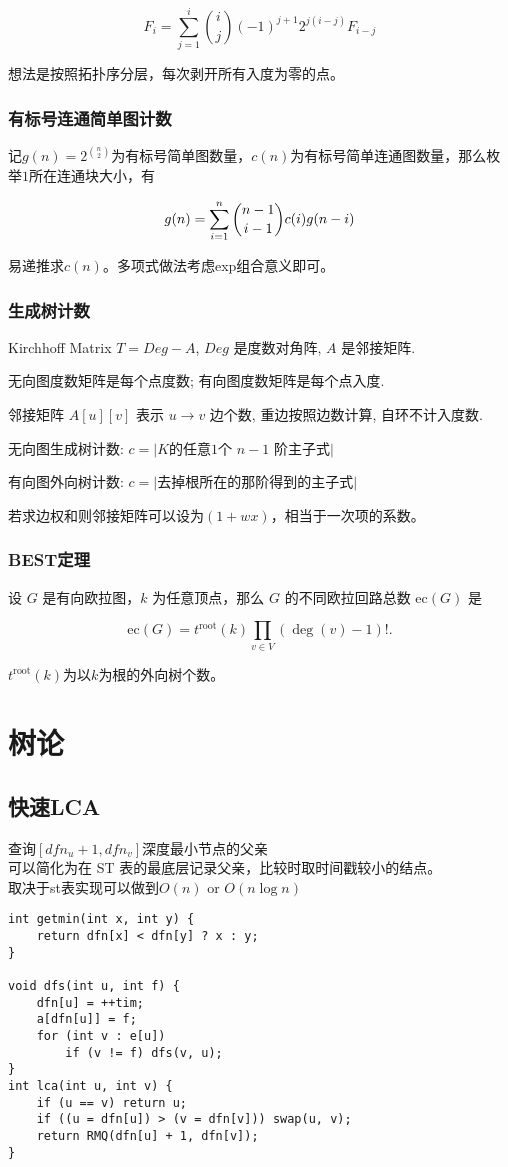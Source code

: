 \documentclass[twoside]{article}
\begin{document}
$$
F_i=\sum_{j=1}^i \binom{i}{j}(-1)^{j+1}2^{j(i-j)}F_{i-j}
$$

想法是按照拓扑序分层，每次剥开所有入度为零的点。

\subsubsection{有标号连通简单图计数}

记$g(n)=2^{\binom n2}$为有标号简单图数量，$c(n)$为有标号简单连通图数量，那么枚举$1$所在连通块大小，有

$$
g(n) = \sum_{i=1}^n \dbinom{n-1}{i-1}c(i)g(n-i)
$$

易递推求$c(n)$。多项式做法考虑exp组合意义即可。

\subsubsection{生成树计数}
Kirchhoff Matrix $T = Deg - A$, $Deg$ 是度数对角阵, $A$ 是邻接矩阵. 

无向图度数矩阵是每个点度数; 有向图度数矩阵是每个点入度.

邻接矩阵 $A[u][v]$ 表示 $u \to v$ 边个数, 重边按照边数计算, 自环不计入度数.

无向图生成树计数: $c = |K$的任意$1$个 $n-1$ 阶主子式$|$

有向图外向树计数: $c = |$去掉根所在的那阶得到的主子式$|$

若求边权和则邻接矩阵可以设为$(1+wx)$，相当于一次项的系数。

\subsubsection{BEST定理}
设 $G$ 是有向欧拉图，$k$ 为任意顶点，那么 $G$ 的不同欧拉回路总数 $\mathrm{ec}(G)$ 是

$$
\mathrm{ec}(G) = t^\mathrm{root}(k)\prod_{v\in V}(\deg (v) - 1)!.
$$

$t^\mathrm{root}(k)$为以$k$为根的外向树个数。\clearpage\section{树论}
\subsection{快速LCA}
查询$[dfn_u + 1 , dfn_v]$深度最小节点的父亲\\
可以简化为在 ST 表的最底层记录父亲，比较时取时间戳较小的结点。\\
取决于st表实现可以做到$O(n)$ or $O(n\log n)$
\begin{lstlisting}
int getmin(int x, int y) {
	return dfn[x] < dfn[y] ? x : y;
}

void dfs(int u, int f) {
	dfn[u] = ++tim;
	a[dfn[u]] = f;
	for (int v : e[u])
		if (v != f) dfs(v, u);
}
int lca(int u, int v) {
	if (u == v) return u;
	if ((u = dfn[u]) > (v = dfn[v])) swap(u, v);
	return RMQ(dfn[u] + 1, dfn[v]);
}\end{lstlisting}
\end{document}
